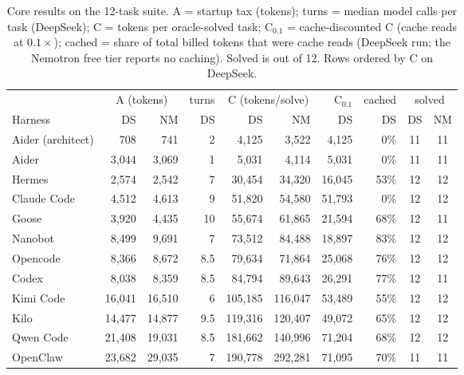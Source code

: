 \documentclass[11pt]{article}
\begin{document}
\begin{table}[t]
\centering
\small
\caption{Core results on the 12-task suite. A = startup tax (tokens); turns = median model calls per task (DeepSeek); C = tokens per oracle-solved task; C$_{0.1}$ = cache-discounted C (cache reads at $0.1\times$); cached = share of total billed tokens that were cache reads (DeepSeek run; the Nemotron free tier reports no caching). Solved is out of 12. Rows ordered by C on DeepSeek.}
\label{tab:main}
\begin{tabular}{l rr r rr r r cc}
\toprule
 & \multicolumn{2}{c}{A (tokens)} & turns & \multicolumn{2}{c}{C (tokens/solve)} & C$_{0.1}$ & cached & \multicolumn{2}{c}{solved} \\
\cmidrule(lr){2-3}\cmidrule(lr){4-4}\cmidrule(lr){5-6}\cmidrule(lr){7-7}\cmidrule(lr){8-8}\cmidrule(lr){9-10}
Harness & DS & NM & DS & DS & NM & DS & DS & DS & NM \\
\midrule
Aider (architect) & 708 & 741 & 2 & 4{,}125 & 3{,}522 & 4{,}125 & 0\% & 11 & 11 \\
Aider             & 3{,}044 & 3{,}069 & 1 & 5{,}031 & 4{,}114 & 5{,}031 & 0\% & 11 & 11 \\
Hermes            & 2{,}574 & 2{,}542 & 7 & 30{,}454 & 34{,}320 & 16{,}045 & 53\% & 12 & 12 \\
Claude Code       & 4{,}512 & 4{,}613 & 9 & 51{,}820 & 54{,}580 & 51{,}793 & 0\% & 12 & 12 \\
Goose             & 3{,}920 & 4{,}435 & 10 & 55{,}674 & 61{,}865 & 21{,}594 & 68\% & 12 & 11 \\
Nanobot           & 8{,}499 & 9{,}691 & 7 & 73{,}512 & 84{,}488 & 18{,}897 & 83\% & 12 & 12 \\
Opencode          & 8{,}366 & 8{,}672 & 8.5 & 79{,}634 & 71{,}864 & 25{,}068 & 76\% & 12 & 12 \\
Codex             & 8{,}038 & 8{,}359 & 8.5 & 84{,}794 & 89{,}643 & 26{,}291 & 77\% & 12 & 11 \\
Kimi Code         & 16{,}041 & 16{,}510 & 6 & 105{,}185 & 116{,}047 & 53{,}489 & 55\% & 12 & 12 \\
Kilo              & 14{,}477 & 14{,}877 & 9.5 & 119{,}316 & 120{,}407 & 49{,}072 & 65\% & 12 & 12 \\
Qwen Code         & 21{,}408 & 19{,}031 & 8.5 & 181{,}662 & 140{,}996 & 71{,}204 & 68\% & 12 & 12 \\
OpenClaw          & 23{,}682 & 29{,}035 & 7 & 190{,}778 & 292{,}281 & 71{,}095 & 70\% & 11 & 11 \\
\bottomrule
\end{tabular}
\end{table}
\end{document}
